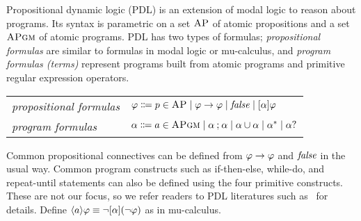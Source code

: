 \documentclass{amsart}
\begin{document}
Propositional dynamic logic (PDL) is an extension of modal logic
to reason about programs.
Its syntax is parametric on a set $\textsc{AP}$ of atomic propositions
and a set $\textsc{APgm}$ of atomic programs.
PDL has two types of formulas;
\emph{propositional formulas} are similar to formulas in modal logic or
mu-calculus,
and \emph{program formulas (terms)} represent programs built from atomic
programs
and primitive regular expression operators.
\begin{center}
	\begin{tabular}{ll}
		\emph{propositional formulas} &
		$\varphi \Coloneqq
		p \in \textsc{AP} \mid
		\varphi \to \varphi \mid
		\mathit{false} \mid
		[\alpha] \varphi$
		\\
		\emph{program formulas} &
		$\alpha \Coloneqq
		a \in \textsc{APgm} \mid
		\alpha \mathbin{;} \alpha \mid
		\alpha \mathbin{\cup} \alpha \mid
		\alpha ^* \mid
		\alpha {?} $
	\end{tabular}
\end{center}
Common propositional connectives can be defined
from $\varphi \to \varphi$ and $\mathit{false}$ in the usual way.
Common program constructs such as if-then-else,
while-do, and repeat-until statements can also be defined using the four
primitive constructs.
These are not our focus, so we refer readers to PDL literatures such
as~\cite{bibid}
for details.
Define $\langle a\rangle \varphi \equiv \neg [\alpha] (\neg \varphi)$ as in
mu-calculus.
\end{document}
